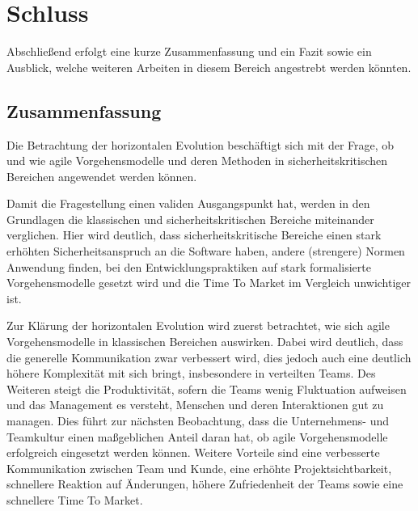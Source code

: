 \chapter{Schluss} %

Abschließend erfolgt eine kurze Zusammenfassung und ein Fazit sowie ein Ausblick, welche weiteren Arbeiten in diesem Bereich angestrebt werden könnten.

\section{Zusammenfassung}



Die Betrachtung der horizontalen Evolution beschäftigt sich mit der Frage, ob und wie agile Vorgehensmodelle und deren Methoden in sicherheitskritischen Bereichen angewendet werden können.

Damit die Fragestellung einen validen Ausgangspunkt hat, werden in den Grundlagen die klassischen und sicherheitskritischen Bereiche miteinander verglichen.
Hier wird deutlich, dass sicherheitskritische Bereiche einen stark erhöhten Sicherheitsanspruch an die Software haben, andere (strengere) Normen Anwendung finden, bei den Entwicklungspraktiken auf stark formalisierte Vorgehensmodelle gesetzt wird und die Time To Market im Vergleich unwichtiger ist.

Zur Klärung der horizontalen Evolution wird zuerst betrachtet, wie sich agile Vorgehensmodelle in klassischen Bereichen auswirken.
Dabei wird deutlich, dass die generelle Kommunikation zwar verbessert wird, dies jedoch auch eine deutlich höhere Komplexität mit sich bringt, insbesondere in verteilten Teams.
Des Weiteren steigt die Produktivität, sofern die Teams wenig Fluktuation aufweisen und das Management es versteht, Menschen und deren Interaktionen gut zu managen.
Dies führt zur nächsten Beobachtung, dass die Unternehmens- und Teamkultur einen maßgeblichen Anteil daran hat, ob agile Vorgehensmodelle erfolgreich eingesetzt werden können.
Weitere Vorteile sind eine verbesserte Kommunikation zwischen Team und Kunde, eine erhöhte Projektsichtbarkeit, schnellere Reaktion auf Änderungen, höhere Zufriedenheit der Teams sowie eine schnellere Time To Market.

